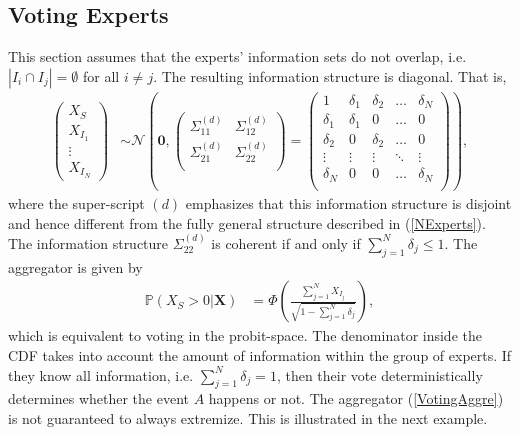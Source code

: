 \documentclass[11pt,twoside]{article}
\renewcommand{\P}{\mathbb{P}}
\theoremstyle{definition}
\theoremstyle{definition}
\begin{document}
\subsection{Voting Experts}
This section assumes that the experts' information sets do not overlap, i.e.   $|I_{i} \cap I_{j}| = \emptyset$ for all $i \neq j$. The resulting information structure is diagonal.  That is,
\begin{align*}
\left(\begin{matrix} X_{S} \\ X_{I_1}\\ \vdots \\ X_{I_N} \end{matrix}\right) &\sim \mathcal{N}\left( 
 \boldsymbol{0}, \left(\begin{matrix} 
\Sigma_{11}^{(d)} & \Sigma_{12}^{(d)}\\
\Sigma_{21}^{(d)} & \Sigma_{22}^{(d)}\\
 \end{matrix}\right) 
 =
 \left(\begin{array}{c|cccc}
1 & \delta_1 & \delta_2 & \dots & \delta_N  \\ \hline
\delta_1 & \delta_1 &0 & \dots & 0   \\ 
\delta_2 & 0 & \delta_2 & \dots & 0  \\ 
\vdots & \vdots & \vdots & \ddots & \vdots  \\ 
\delta_N & 0 & 0 & \dots & \delta_N\\ 
 \end{array}\right)\right),
\end{align*}
where the super-script $(d)$ emphasizes that this information structure is disjoint and hence different from the fully general structure described in (\ref{NExperts}). The information structure $\Sigma_{22}^{(d)}$ is coherent if and only if $\sum_{j=1}^N \delta_j \leq 1$. The aggregator is given by
\begin{align}
\P\left(X_{S} > 0 | \boldsymbol{X}\right) &= \Phi\left( \frac{\sum_{j=1}^N X_{I_j}}{\sqrt{1 - \sum_{j=1}^N \delta_j}}\right), \label{VotingAggre}
\end{align}
which is equivalent to voting in the probit-space. The denominator inside the CDF takes into account  the amount of information within the group of experts. If they know all information, i.e. $\sum_{j=1}^N \delta_j = 1$, then their vote deterministically determines whether the event $A$ happens or not. The aggregator (\ref{VotingAggre}) is not guaranteed to always extremize. This is illustrated in the next example.
\end{document}
